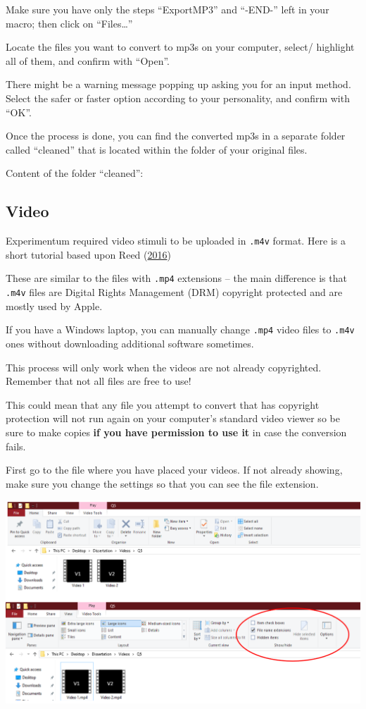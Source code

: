 \documentclass[]{book}
\begin{document}
Make sure you have only the steps ``ExportMP3'' and ``-END-'' left in
your macro; then click on ``Files\ldots{}''

Locate the files you want to convert to mp3s on your computer, select/
highlight all of them, and confirm with ``Open''.

There might be a warning message popping up asking you for an input
method. Select the safer or faster option according to your personality,
and confirm with ``OK''.

Once the process is done, you can find the converted mp3s in a separate
folder called ``cleaned'' that is located within the folder of your
original files.

Content of the folder ``cleaned'':

\subsection{Video}\label{video}

Experimentum required video stimuli to be uploaded in \texttt{.m4v}
format. Here is a short tutorial based upon Reed
(\protect\hyperlink{ref-m4vconv}{2016})

These are similar to the files with \texttt{.mp4} extensions -- the main
difference is that \texttt{.m4v} files are Digital Rights Management
(DRM) copyright protected and are mostly used by Apple.

If you have a Windows laptop, you can manually change \texttt{.mp4}
video files to \texttt{.m4v} ones without downloading additional
software sometimes.

\begin{warning}
This process will only work when the videos are not already copyrighted.
Remember that not all files are free to use!

This could mean that any file you attempt to convert that has copyright
protection will not run again on your computer's standard video viewer
so be sure to make copies \textbf{if you have permission to use it} in
case the conversion fails.
\end{warning}

First go to the file where you have placed your videos. If not already
showing, make sure you change the settings so that you can see the file
extension.

\includegraphics{images/screenshots/video_conv_1.png}
\end{document}
